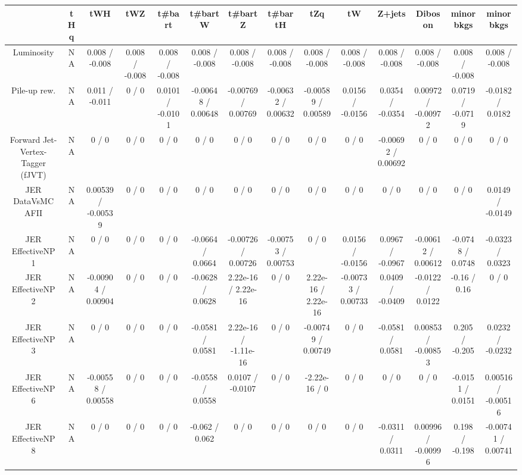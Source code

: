\documentclass[10pt]{article}
\begin{document}
\begin{table}[htbp]
\begin{center}
\begin{tabular}{|c|c|c|c|c|c|c|c|c|c|c|c|c|c|}
\hline 
      & tHq      & tWH      & tWZ      & t#bar{t}      & t#bar{t}W      & t#bar{t}Z      & t#bar{t}H      & tZq      & tW      & Z+jets      & Diboson      & minor bkgs      & minor bkgs \\ 
\hline 
  Luminosity &    NA    & 0.008 / -0.008 & 0.008 / -0.008 & 0.008 / -0.008 & 0.008 / -0.008 & 0.008 / -0.008 & 0.008 / -0.008 & 0.008 / -0.008 & 0.008 / -0.008 & 0.008 / -0.008 & 0.008 / -0.008 & 0.008 / -0.008 & 0.008 / -0.008 \\ 
  Pile-up rew. &    NA    & 0.011 / -0.011 & 0 / 0 & 0.0101 / -0.0101 & -0.00648 / 0.00648 & -0.00769 / 0.00769 & -0.00632 / 0.00632 & -0.00589 / 0.00589 & 0.0156 / -0.0156 & 0.0354 / -0.0354 & 0.00972 / -0.00972 & 0.0719 / -0.0719 & -0.0182 / 0.0182 \\ 
  Forward Jet-Vertex-Tagger (fJVT) &    NA    & 0 / 0 & 0 / 0 & 0 / 0 & 0 / 0 & 0 / 0 & 0 / 0 & 0 / 0 & 0 / 0 & -0.00692 / 0.00692 & 0 / 0 & 0 / 0 & 0 / 0 \\ 
  JER DataVsMC AFII &    NA    & 0.00539 / -0.00539 & 0 / 0 & 0 / 0 & 0 / 0 & 0 / 0 & 0 / 0 & 0 / 0 & 0 / 0 & 0 / 0 & 0 / 0 & 0 / 0 & 0.0149 / -0.0149 \\ 
  JER EffectiveNP 1 &    NA    & 0 / 0 & 0 / 0 & 0 / 0 & -0.0664 / 0.0664 & -0.00726 / 0.00726 & -0.00753 / 0.00753 & 0 / 0 & 0.0156 / -0.0156 & 0.0967 / -0.0967 & -0.00612 / 0.00612 & -0.0748 / 0.0748 & -0.0323 / 0.0323 \\ 
  JER EffectiveNP 2 &    NA    & -0.00904 / 0.00904 & 0 / 0 & 0 / 0 & -0.0628 / 0.0628 & 2.22e-16 / 2.22e-16 & 0 / 0 & 2.22e-16 / 2.22e-16 & -0.00733 / 0.00733 & 0.0409 / -0.0409 & -0.0122 / 0.0122 & -0.16 / 0.16 & 0 / 0 \\ 
  JER EffectiveNP 3 &    NA    & 0 / 0 & 0 / 0 & 0 / 0 & -0.0581 / 0.0581 & 2.22e-16 / -1.11e-16 & 0 / 0 & -0.00749 / 0.00749 & 0 / 0 & -0.0581 / 0.0581 & 0.00853 / -0.00853 & 0.205 / -0.205 & 0.0232 / -0.0232 \\ 
  JER EffectiveNP 6 &    NA    & -0.00558 / 0.00558 & 0 / 0 & 0 / 0 & -0.0558 / 0.0558 & 0.0107 / -0.0107 & 0 / 0 & -2.22e-16 / 0 & 0 / 0 & 0 / 0 & 0 / 0 & -0.0151 / 0.0151 & 0.00516 / -0.00516 \\ 
  JER EffectiveNP 8 &    NA    & 0 / 0 & 0 / 0 & 0 / 0 & -0.062 / 0.062 & 0 / 0 & 0 / 0 & 0 / 0 & 0 / 0 & -0.0311 / 0.0311 & 0.00996 / -0.00996 & 0.198 / -0.198 & -0.00741 / 0.00741 \\ 

\end{tabular}
\end{center}
\end{table}
\end{document}

